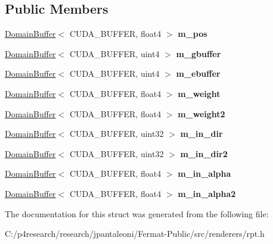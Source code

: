 \subsection*{Public Members}
\begin{DoxyCompactItemize}
\item 
\mbox{\label{struct_r_p_t_v_p_l_storage_acbc7bc2968ba0890f1908519553b67d4}} 
\hyperlink{class_domain_buffer}{Domain\+Buffer}$<$ C\+U\+D\+A\+\_\+\+B\+U\+F\+F\+ER, float4 $>$ {\bfseries m\+\_\+pos}
\item 
\mbox{\label{struct_r_p_t_v_p_l_storage_aa2e4f83957318b2f11f3f412c534a4ad}} 
\hyperlink{class_domain_buffer}{Domain\+Buffer}$<$ C\+U\+D\+A\+\_\+\+B\+U\+F\+F\+ER, uint4 $>$ {\bfseries m\+\_\+gbuffer}
\item 
\mbox{\label{struct_r_p_t_v_p_l_storage_aa4f7eaca20a1d8aef01a24ef5c8f8b68}} 
\hyperlink{class_domain_buffer}{Domain\+Buffer}$<$ C\+U\+D\+A\+\_\+\+B\+U\+F\+F\+ER, uint4 $>$ {\bfseries m\+\_\+ebuffer}
\item 
\mbox{\label{struct_r_p_t_v_p_l_storage_a20d6754f7e745aa6bc19a6157e6660fc}} 
\hyperlink{class_domain_buffer}{Domain\+Buffer}$<$ C\+U\+D\+A\+\_\+\+B\+U\+F\+F\+ER, float4 $>$ {\bfseries m\+\_\+weight}
\item 
\mbox{\label{struct_r_p_t_v_p_l_storage_a646f957b5b903d9c1126e770939ac550}} 
\hyperlink{class_domain_buffer}{Domain\+Buffer}$<$ C\+U\+D\+A\+\_\+\+B\+U\+F\+F\+ER, float4 $>$ {\bfseries m\+\_\+weight2}
\item 
\mbox{\label{struct_r_p_t_v_p_l_storage_a8f2601f8c1e1255ba7ae7e2207ed9697}} 
\hyperlink{class_domain_buffer}{Domain\+Buffer}$<$ C\+U\+D\+A\+\_\+\+B\+U\+F\+F\+ER, uint32 $>$ {\bfseries m\+\_\+in\+\_\+dir}
\item 
\mbox{\label{struct_r_p_t_v_p_l_storage_a7cc0c9a6c8e216d2e71f091ffcdb50a7}} 
\hyperlink{class_domain_buffer}{Domain\+Buffer}$<$ C\+U\+D\+A\+\_\+\+B\+U\+F\+F\+ER, uint32 $>$ {\bfseries m\+\_\+in\+\_\+dir2}
\item 
\mbox{\label{struct_r_p_t_v_p_l_storage_a3c7e4d1287ab9921b2690ae33c56a876}} 
\hyperlink{class_domain_buffer}{Domain\+Buffer}$<$ C\+U\+D\+A\+\_\+\+B\+U\+F\+F\+ER, float4 $>$ {\bfseries m\+\_\+in\+\_\+alpha}
\item 
\mbox{\label{struct_r_p_t_v_p_l_storage_a1727425d44f791b706ef3796497d5832}} 
\hyperlink{class_domain_buffer}{Domain\+Buffer}$<$ C\+U\+D\+A\+\_\+\+B\+U\+F\+F\+ER, float4 $>$ {\bfseries m\+\_\+in\+\_\+alpha2}
\end{DoxyCompactItemize}


The documentation for this struct was generated from the following file\+:\begin{DoxyCompactItemize}
\item 
C\+:/p4research/research/jpantaleoni/\+Fermat-\/\+Public/src/renderers/rpt.\+h\end{DoxyCompactItemize}
